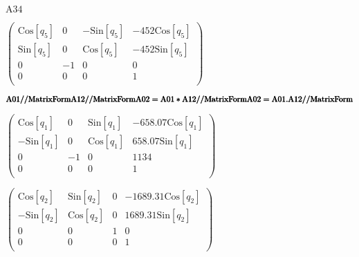 \documentclass{article}
\begin{document}
\begin{doublespace}
\noindent\(\text{A34}\)
\end{doublespace}

\begin{doublespace}
\noindent\(\left(
\begin{array}{cccc}
 \text{Cos}\left[q_5\right] & 0 & -\text{Sin}\left[q_5\right] & -452 \text{Cos}\left[q_5\right] \\
 \text{Sin}\left[q_5\right] & 0 & \text{Cos}\left[q_5\right] & -452 \text{Sin}\left[q_5\right] \\
 0 & -1 & 0 & 0 \\
 0 & 0 & 0 & 1 \\
\end{array}
\right)\)
\end{doublespace}

\begin{doublespace}
\noindent\(\pmb{\text{A01}\text{//}\text{MatrixForm}}\\
\pmb{\text{A12}\text{//}\text{MatrixForm}}\\
\pmb{\text{A02}=\text{A01}*\text{A12}\text{//}\text{MatrixForm}}\\
\pmb{\text{A02}=\text{A01}.\text{A12}\text{//}\text{MatrixForm}}\\
\pmb{}\)
\end{doublespace}

\begin{doublespace}
\noindent\(\left(
\begin{array}{cccc}
 \text{Cos}\left[q_1\right] & 0 & \text{Sin}\left[q_1\right] & -658.07 \text{Cos}\left[q_1\right] \\
 -\text{Sin}\left[q_1\right] & 0 & \text{Cos}\left[q_1\right] & 658.07 \text{Sin}\left[q_1\right] \\
 0 & -1 & 0 & 1134 \\
 0 & 0 & 0 & 1 \\
\end{array}
\right)\)
\end{doublespace}

\begin{doublespace}
\noindent\(\left(
\begin{array}{cccc}
 \text{Cos}\left[q_2\right] & \text{Sin}\left[q_2\right] & 0 & -1689.31 \text{Cos}\left[q_2\right] \\
 -\text{Sin}\left[q_2\right] & \text{Cos}\left[q_2\right] & 0 & 1689.31 \text{Sin}\left[q_2\right] \\
 0 & 0 & 1 & 0 \\
 0 & 0 & 0 & 1 \\
\end{array}
\right)\)
\end{doublespace}
\end{document}

